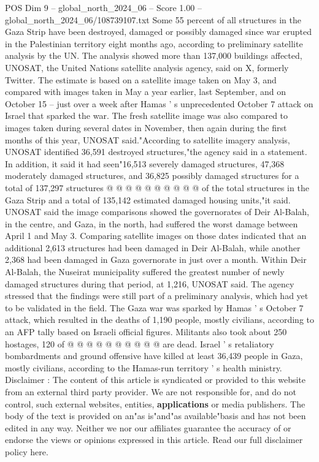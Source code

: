 \begin{textsample}{POS Dim 9 – global\_north\_2024\_06 – Score 1.00 – global\_north\_2024\_06/108739107.txt}  \label{ex:f9_pos_279}
Some 55 percent of all structures in the Gaza Strip have been destroyed, damaged or possibly damaged since war erupted in the Palestinian territory eight months ago, according to preliminary satellite analysis by the UN.
The analysis showed more than 137,000 buildings affected, UNOSAT, the United Nations satellite analysis agency, said on X, formerly Twitter.
The estimate is based on a satellite image taken on May 3, and compared with images taken in May a year earlier, last September, and on October 15 -- just over a week after Hamas ' s unprecedented October 7 attack on Israel that sparked the war.
The fresh satellite image was also compared to images taken during several dates in November, then again during the first months of this year, UNOSAT said."According to satellite imagery analysis, UNOSAT identified 36,591 destroyed structures,"the agency said in a statement.
In addition, it said it had seen"16,513 severely damaged structures, 47,368 moderately damaged structures, and 36,825 possibly damaged structures for a total of 137,297 structures @ @ @ @ @ @ @ @ @ @ of the total structures in the Gaza Strip and a total of 135,142 estimated damaged housing units,"it said.
UNOSAT said the image comparisons showed the governorates of Deir Al-Balah, in the centre, and Gaza, in the north, had suffered the worst damage between April 1 and May 3.
Comparing satellite images on those dates indicated that an additional 2,613 structures had been damaged in Deir Al-Balah, while another 2,368 had been damaged in Gaza governorate in just over a month.
Within Deir Al-Balah, the Nuseirat municipality suffered the greatest number of newly damaged structures during that period, at 1,216, UNOSAT said.
The agency stressed that the findings were still part of a preliminary analysis, which had yet to be validated in the field.
The Gaza war was sparked by Hamas ' s October 7 attack, which resulted in the deaths of 1,190 people, mostly civilians, according to an AFP tally based on Israeli official figures.
Militants also took about 250 hostages, 120 of @ @ @ @ @ @ @ @ @ @ are dead.
Israel ' s retaliatory bombardments and ground offensive have killed at least 36,439 people in Gaza, mostly civilians, according to the Hamas-run territory ' s health ministry.
Disclaimer : The content of this article is syndicated or provided to this website from an external third party provider.
We are not responsible for, and do not control, such external websites, entities, \textbf{applications} or media publishers.
The body of the text is provided on an"as is"and"as available"basis and has not been edited in any way.
Neither we nor our affiliates guarantee the accuracy of or endorse the views or opinions expressed in this article.
Read our full disclaimer policy here.

\end{textsample}
